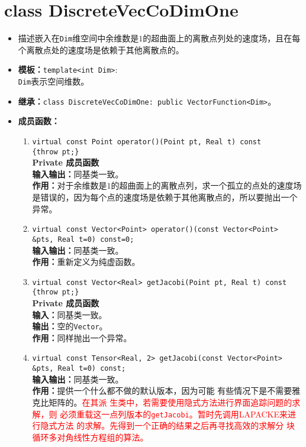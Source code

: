 \documentclass[a4paper,twoside]{ctexart}
\begin{document}
\section{class DiscreteVecCoDimOne}
\begin{itemize}
    \item 描述嵌入在\texttt{Dim}维空间中余维数是$1$的超曲面上的离散点列处的速度场，且在每个离散点处的速度场是依赖于其他离散点的。
    \item \textbf{模板：}\texttt{template<int Dim>}:\\
    \texttt{Dim}表示空间维数。
    \item \textbf{继承：}\texttt{class DiscreteVecCoDimOne: public VectorFunction<Dim>}。
    \item \textbf{成员函数：}
            \begin{enumerate}[(1)]
                \item \texttt{virtual const Point operator()(Point pt, Real t) const\\
                \{throw pt;\}}\\
                \textbf{Private 成员函数}\\
                \textbf{输入输出：}同基类一致。\\
                \textbf{作用：}对于余维数是$1$的超曲面上的离散点列，求一个孤立的点处的速度场是错误的，因为每个点的速度场是依赖于其他离散点的，所以要抛出一个异常。
                \item \texttt{virtual const Vector<Point> operator()(const Vector<Point> \&pts, Real t=0) const=0;}\\
                \textbf{输入输出：}同基类一致。\\
                \textbf{作用：}重新定义为纯虚函数。
                \item \texttt{virtual const Vector<Real> getJacobi(Point pt, Real t) const\\
                \{throw pt;\}}\\
                \textbf{Private 成员函数}\\
                \textbf{输入：}同基类一致。\\
                \textbf{输出：}空的\texttt{Vector}。\\
                \textbf{作用：}同样抛出一个异常。
                \item \texttt{virtual const Tensor<Real, 2> getJacobi(const Vector<Point> \&pts, Real t=0) const;}\\
                \textbf{输入输出：}同基类一致。\\
                \textbf{作用：}提供一个什么都不做的默认版本，因为可能
                有些情况下是不需要雅克比矩阵的。\textcolor{red}{在其派
                  生类中，若需要使用隐式方法进行界面追踪问题的求解，则
                  必须重载这一点列版本的\texttt{getJacobi}。暂时先调用LAPACKE来进行隐式方法
                    的求解。先得到一个正确的结果之后再寻找高效的求解分
                    块循环多对角线性方程组的算法。}
            \end{enumerate}
\end{itemize}
\end{document}
